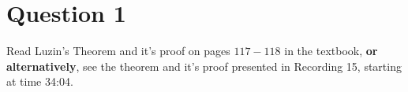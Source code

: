 \section{Question 1}

\begin{question}
    Read Luzin's Theorem and it's proof on pages $117-118$ in the textbook, \textbf{or alternatively}, see the theorem and it's proof presented in Recording 15, starting at time 34:04.
\end{question}